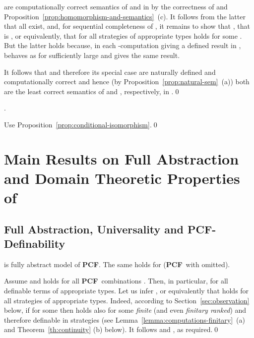 \documentclass[fleqn]{LMCS}
\theoremstyle{plain}\newtheorem{satz}[thm]{Satz}
\theoremstyle{plain}\newtheorem{hyp}[thm]{Hypothesis}
\theoremstyle{plain}\newtheorem{hyps}[thm]{Hypotheses}
\theoremstyle{definition}\newtheorem{note}[thm]{Note}
\newcommand{\PCF}{\mbox{\bf PCF}}
\newcommand{\?}{\mbox{?}}
\begin{document}
\begin{enumerate}[(a)]
are computationally correct semantics of  and  in  
by the correctness of  
and Proposition~\ref{prop:homomorphism-and-semantics}~(c). 
It follows from the latter that all  exist, and, for 
sequential completeness of  , it remains to show that 
, that is 
, or equivalently, that 
for all strategies  of appropriate types
 holds for some . 
But the latter holds because, in each -computation 
giving a defined result in , 
 behaves as  for sufficiently large  and gives the same result. 


It follows that  and therefore its special case 
 are naturally defined and computationally correct and hence (by 
Proposition~\ref{prop:natural-sem}~(a))
both are the least correct semantics of  and , respectively, in .\qed
\end{enumerate}



\begin{cor}\label{corr:isomorphism}
.
\end{cor}
\proof 
Use Proposition~\ref{prop:conditional-isomorphism}.\qed











\section{Main Results on Full Abstraction and Domain Theoretic Properties 
of \texorpdfstring{}{Q}}
\label{sec:full-abs}


\subsection{Full Abstraction, Universality and 
\texorpdfstring{\PCF}{PCF}-Definability}
\label{sec:main-res}


\begin{thm}\label{th:full-abstr}
 is fully abstract model of\/ \PCF. 
The same holds for  (\PCF\ with  omitted). 
\end{thm}
\proof 
Assume  and  holds 
for all \PCF\ combinations . Then, in particular, 
 for all  definable terms  
of appropriate types. Let us infer , or equivalently 
that  holds for all strategies  of appropriate types. 
Indeed, according to Section~\ref{sec:observation} below, 
if  for some  then  holds also 
for some \emph{finite} (and even \emph{finitary ranked}) and 
therefore definable in  strategies  
(see Lemma~\ref{lemma:computations-finitary}~(a) 
and Theorem~\ref{th:continuity} (b) below). 
It follows  and , as required.\qed
\end{document}
